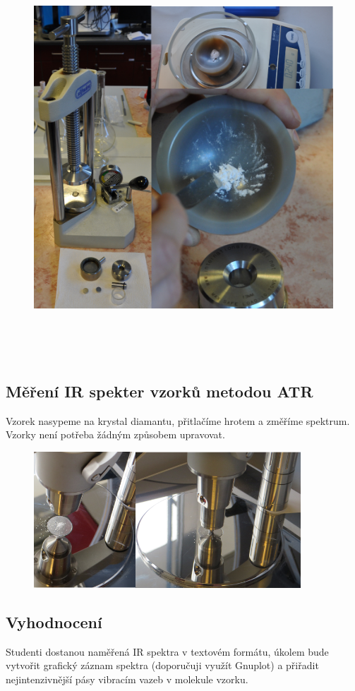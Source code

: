\documentclass[12pt]{article}
\begin{document}
\begin{figure}[h]
	\includegraphics[keepaspectratio,height=15cm]{img/KBr.png}
\end{figure}
\newpage

\subsection{Měření IR spekter vzorků metodou ATR}
Vzorek nasypeme na krystal diamantu, přitlačíme hrotem a změříme spektrum. Vzorky není potřeba žádným způsobem upravovat.

\begin{figure}[h]
	\includegraphics[keepaspectratio,width=10cm]{img/atr.png}
\end{figure}

\subsection{Vyhodnocení}

Studenti dostanou naměřená IR spektra v textovém formátu, úkolem bude vytvořit grafický záznam spektra (doporučuji využít Gnuplot) a přiřadit nejintenzivnější pásy vibracím vazeb v molekule vzorku.
\end{document}

